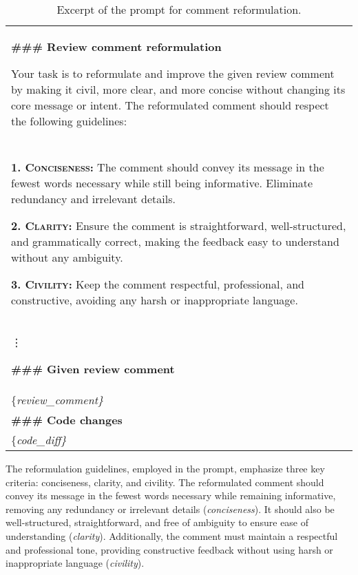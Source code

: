 \begin{table}[!t]
\centering
\caption{Excerpt of the prompt for comment reformulation.}
\label{tab:reform_prompt}
\begin{tabularx}{\linewidth}{X}
\toprule
\textbf{\#\#\# Review comment reformulation}

Your task is to reformulate and improve the given review comment by making it civil, more clear, and more concise without changing its core message or intent. 
The reformulated comment should respect the following guidelines:\\
\\
\textsc{\textbf{1. Conciseness:}} The comment should convey its message in the fewest words necessary while still being informative. Eliminate redundancy and irrelevant details.
\vspace{.5em}

\textsc{\textbf{2. Clarity:}} Ensure the comment is straightforward, well-structured, and grammatically correct, making the feedback easy to understand without any ambiguity.
\vspace{.5em}

\textsc{\textbf{3. Civility:}} Keep the comment respectful, professional, and constructive, avoiding any harsh or inappropriate language.\\

\hspace{0.5\linewidth}\vdots

\textbf{\#\#\# Given review comment}\\
\{\textit{review\_comment\}}\\

\textbf{\#\#\# Code changes}\\
\{\textit{code\_diff\}}\\
\bottomrule
\end{tabularx}
\vspace{-1em}
\end{table}


The reformulation guidelines, employed in the prompt, emphasize three key criteria: conciseness, clarity, and civility. The reformulated comment should convey its message in the fewest words necessary while remaining informative, removing any redundancy or irrelevant details (\emph{conciseness}). It should also be well-structured, straightforward, and free of ambiguity to ensure ease of understanding (\emph{clarity}). Additionally, the comment must maintain a respectful and professional tone, providing constructive feedback without using harsh or inappropriate language (\emph{civility}).


